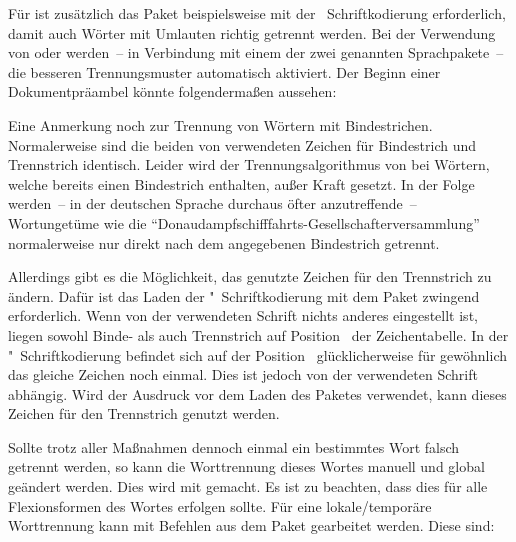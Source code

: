 Für  ist zusätzlich das Paket  beispielsweise 
mit der ~Schriftkodierung erforderlich, damit auch Wörter mit 
Umlauten richtig getrennt werden. Bei der Verwendung von  
oder  werden~-- in Verbindung mit einem der zwei genannten 
Sprachpakete~-- die besseren Trennungsmuster automatisch aktiviert. Der Beginn 
einer Dokumentpräambel könnte folgendermaßen aussehen:
%
\begin{quoting}[rightmargin=0pt]
\end{quoting}
%
Eine Anmerkung noch zur Trennung von Wörtern mit Bindestrichen. Normalerweise 
sind die beiden von  verwendeten Zeichen für Bindestrich und 
Trennstrich identisch. Leider wird der Trennungsalgorithmus von  
bei Wörtern, welche bereits einen Bindestrich enthalten, außer Kraft gesetzt. 
In der Folge werden~-- in der deutschen Sprache durchaus öfter anzutreffende~-- 
Wortungetüme wie die \enquote{Donaudampfschifffahrts-Gesellschafterversammlung} 
normalerweise nur direkt nach dem angegebenen Bindestrich getrennt. 

Allerdings gibt es die Möglichkeit, das genutzte Zeichen für den Trennstrich 
zu ändern. Dafür ist das Laden der "~Schriftkodierung mit dem Paket 
 zwingend erforderlich. Wenn von der verwendeten Schrift 
nichts anderes eingestellt ist, liegen sowohl Binde- als auch Trennstrich auf 
Position~ der Zeichentabelle. In der "~Schriftkodierung 
befindet sich auf der Position~ glücklicherweise für gewöhnlich das 
gleiche Zeichen noch einmal. Dies ist jedoch von der verwendeten Schrift 
abhängig. Wird der Ausdruck  vor dem 
Laden des Paketes  verwendet, kann dieses Zeichen für den 
Trennstrich genutzt werden. 

Sollte trotz aller Maßnahmen dennoch einmal ein bestimmtes Wort falsch getrennt 
werden, so kann die Worttrennung dieses Wortes manuell und global geändert 
werden. Dies wird mit  gemacht. 
Es ist zu beachten, dass dies für alle Flexionsformen des Wortes erfolgen 
sollte. Für eine lokale/temporäre Worttrennung kann mit Befehlen aus dem Paket 
 gearbeitet werden. Diese sind: 


